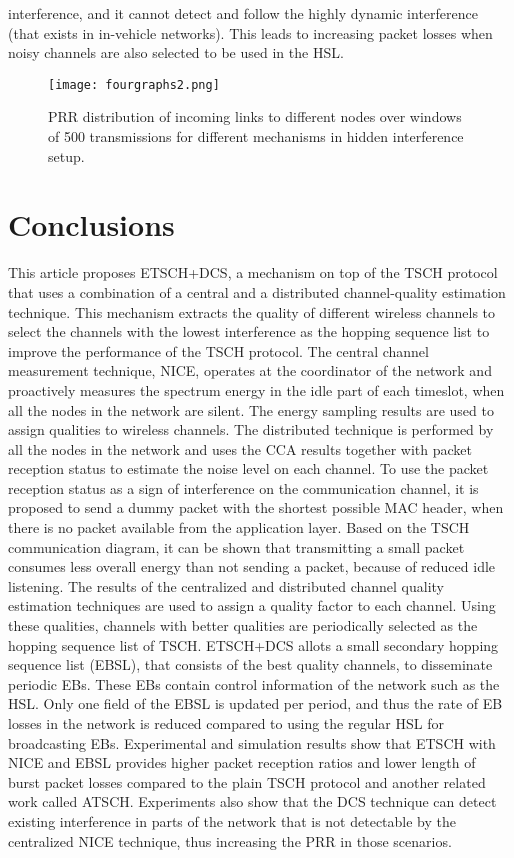 \documentclass[acmsmall, authorversion]{acmart}
\begin{document}
interference, and it cannot detect and follow the highly dynamic interference (that exists in in-vehicle networks). This leads to increasing packet losses when noisy channels are also selected to be used in the HSL.


\begin{figure*}[t]
\begin{multicols}
\centering
    \texttt{[image: fourgraphs2.png]}
    \caption{PRR distribution of incoming links to different nodes over windows of 500 transmissions for different mechanisms in hidden interference setup.}
\end{multicols}
\end{figure*}


\section{Conclusions}
This article proposes ETSCH+DCS, a mechanism on top of the TSCH protocol that uses a combination of a central and a distributed channel-quality estimation technique. This mechanism extracts the quality of different wireless channels to select the channels with the lowest interference as the hopping sequence list to improve the performance of the TSCH protocol. The central channel measurement technique, NICE, operates at the coordinator of the network and proactively measures the spectrum energy in the idle part of each timeslot, when all the nodes in the network are silent. The energy sampling results are used to assign qualities to wireless channels. The distributed technique is performed by all the nodes in the network and uses the CCA results together with packet reception status to estimate the noise level on each channel. To use the packet reception status as a sign of interference on the communication channel, it is proposed to send a dummy packet with the shortest possible MAC header, when there is no packet available from the application layer. Based on the TSCH communication diagram, it can be shown that transmitting a small packet consumes less overall energy than not sending a packet, because of reduced idle listening. The results of the centralized and distributed channel quality estimation techniques are used to assign a quality factor to each channel. Using these qualities, channels with better qualities are periodically selected as the hopping sequence list of TSCH. ETSCH+DCS allots a small secondary hopping sequence list (EBSL), that consists of the best quality channels, to disseminate periodic EBs. These EBs contain control information of the network such as the HSL. Only one field of the EBSL is updated per period, and thus the rate of EB losses in the network is reduced compared to using the regular HSL for broadcasting EBs. Experimental and simulation results show that ETSCH with NICE and EBSL provides higher packet reception ratios and lower length of burst packet losses compared to the plain TSCH protocol and another related work called ATSCH. Experiments also show that the DCS technique can detect existing interference in parts of the network that is not detectable by the centralized NICE technique, thus increasing the PRR in those scenarios.

    



  
\end{document}
